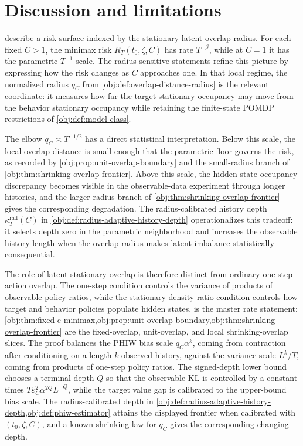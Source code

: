 \section{Discussion and limitations}

 describe a risk surface indexed by the stationary latent-overlap radius. For each fixed \(C>1\), the minimax risk \(R_T(t_0,\zeta,C)\) has rate \(T^{-\beta}\), while at \(C=1\) it has the parametric \(T^{-1}\) scale. The radius-sensitive statements refine this picture by expressing how the risk changes as \(C\) approaches one. In that local regime, the normalized radius \(q_C\) from \cref{obj:def:overlap-distance-radius} is the relevant coordinate: it measures how far the target stationary occupancy may move from the behavior stationary occupancy while retaining the finite-state POMDP restrictions of \cref{obj:def:model-class}.

The elbow \(q_C\asymp T^{-1/2}\) has a direct statistical interpretation. Below this scale, the local overlap distance is small enough that the parametric floor governs the risk, as recorded by \cref{obj:prop:unit-overlap-boundary} and the small-radius branch of \cref{obj:thm:shrinking-overlap-frontier}. Above this scale, the hidden-state occupancy discrepancy becomes visible in the observable-data experiment through longer histories, and the larger-radius branch of \cref{obj:thm:shrinking-overlap-frontier} gives the corresponding degradation. The radius-calibrated history depth \(\kappa_T^{\mathrm{rad}}(C)\) in \cref{obj:def:radius-adaptive-history-depth} operationalizes this tradeoff: it selects depth zero in the parametric neighborhood and increases the observable history length when the overlap radius makes latent imbalance statistically consequential.

The role of latent stationary overlap is therefore distinct from ordinary one-step action overlap. The one-step condition controls the variance of products of observable policy ratios, while the stationary density-ratio condition controls how target and behavior policies populate hidden states.  is the master rate statement: \cref{obj:thm:fixed-c-minimax,obj:prop:unit-overlap-boundary,obj:thm:shrinking-overlap-frontier} are the fixed-overlap, unit-overlap, and local shrinking-overlap slices. The proof balances the PHIW bias scale \(q_C\alpha^k\), coming from contraction after conditioning on a length-\(k\) observed history, against the variance scale \(L^k/T\), coming from products of one-step policy ratios. The signed-depth lower bound chooses a terminal depth \(Q\) so that the observable KL is controlled by a constant times \(T\varepsilon_C^2\alpha^{2Q}L^{-Q}\), while the target value gap is calibrated to the upper-bound bias scale. The radius-calibrated depth in \cref{obj:def:radius-adaptive-history-depth,obj:def:phiw-estimator} attains the displayed frontier when calibrated with \((t_0,\zeta,C)\), and a known shrinking law for \(q_C\) gives the corresponding changing depth.

